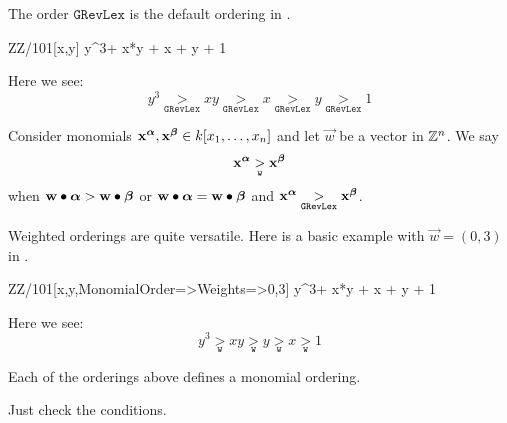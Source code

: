 \documentclass{ximera}
\begin{document}
The order $\mathtt{GRevLex}$ is the default ordering in \macaulay.

\begin{macaulay2}
ZZ/101[x,y]
y^3+ x*y + x + y + 1
\end{macaulay2}

Here we see:
\[
y^3 \underset{\mathtt{GRevLex}}{>} xy \underset{\mathtt{GRevLex}}{>} x  \underset{\mathtt{GRevLex}}{>} y \underset{\mathtt{GRevLex}}{>} 1
\]

\begin{definition}
  Consider monomials $\mathbf{x}^{\boldsymbol\alpha},\mathbf{x}^{\boldsymbol\beta}\in k[x_1,\dots, x_n]$ and
  let $\vec{w}$ be a vector in $\mathbb Z^n$. We say
  \[
  \mathbf{x}^{\boldsymbol\alpha} \underset{\mathtt{w}}{>}\mathbf{x}^{\boldsymbol\beta}
  \]
  when $\mathbf{w}\bullet {\boldsymbol\alpha} > \mathbf{w}\bullet {\boldsymbol\beta}$ or $\mathbf{w}\bullet
  {\boldsymbol\alpha} = \mathbf{w}\bullet {\boldsymbol\beta}$ and $\mathbf{x}^{\boldsymbol\alpha}
  \underset{\mathtt{GRevLex}}{>}\mathbf{x}^{\boldsymbol\beta}$.
\end{definition}

Weighted orderings are quite versatile. Here is a basic example with
$\vec{w} = (0,3)$ in \macaulay.

\begin{macaulay2}
ZZ/101[x,y,MonomialOrder=>{Weights=>{0,3}}]
y^3+ x*y + x + y + 1
\end{macaulay2}

Here we see:
\[
y^3 \underset{\mathtt{w}}{>} xy \underset{\mathtt{w}}{>} y \underset{\mathtt{w}}{>} x \underset{\mathtt{w}}{>} 1
\]

\begin{proposition}
  Each of the orderings above defines a monomial ordering.
  \begin{sketch}
    Just check the conditions.
  \end{sketch}
\end{proposition}
\end{document}
